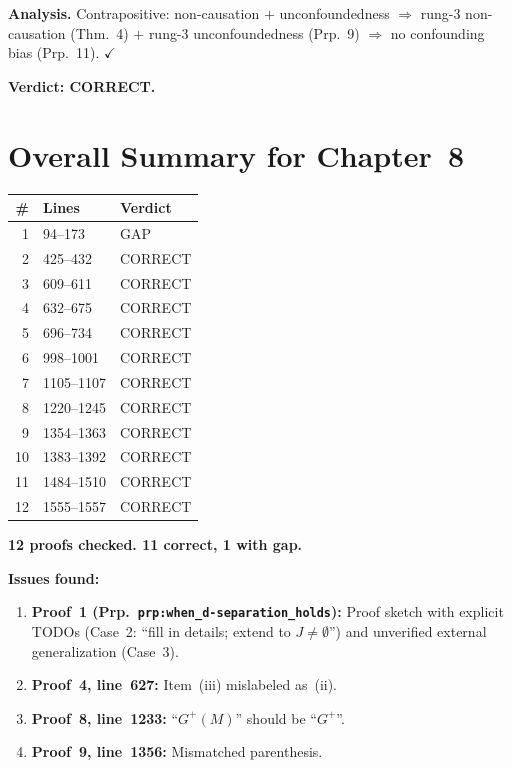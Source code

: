 \documentclass{article}
\begin{document}
\textbf{Analysis.}
Contrapositive: non-causation $+$ unconfoundedness $\Rightarrow$
rung-3 non-causation (Thm.~4) $+$ rung-3 unconfoundedness (Prp.~9)
$\Rightarrow$ no confounding bias (Prp.~11).  $\checkmark$

\textbf{Verdict: CORRECT.}

\section*{Overall Summary for Chapter~8}

\begin{center}
\begin{tabular}{r|l|l}
\textbf{\#} & \textbf{Lines} & \textbf{Verdict} \\ \hline
1  & 94--173    & GAP \\
2  & 425--432   & CORRECT \\
3  & 609--611   & CORRECT \\
4  & 632--675   & CORRECT \\
5  & 696--734   & CORRECT \\
6  & 998--1001  & CORRECT \\
7  & 1105--1107 & CORRECT \\
8  & 1220--1245 & CORRECT \\
9  & 1354--1363 & CORRECT \\
10 & 1383--1392 & CORRECT \\
11 & 1484--1510 & CORRECT \\
12 & 1555--1557 & CORRECT \\
\end{tabular}
\end{center}

\textbf{12 proofs checked.  11 correct, 1 with gap.}

\bigskip\noindent
\textbf{Issues found:}
\begin{enumerate}
  \item \textbf{Proof~1 (Prp.\ \texttt{prp:when\_d-separation\_holds}):}
    Proof sketch with explicit TODOs (Case~2: ``fill in details; extend to
    $J\neq\emptyset$'') and unverified external generalization (Case~3).
  \item \textbf{Proof~4, line~627:} Item~(iii) mislabeled as~(ii).
  \item \textbf{Proof~8, line~1233:} ``$G^+(M)$'' should be ``$G^+$''.
  \item \textbf{Proof~9, line~1356:} Mismatched parenthesis.
\end{enumerate}
\end{document}

